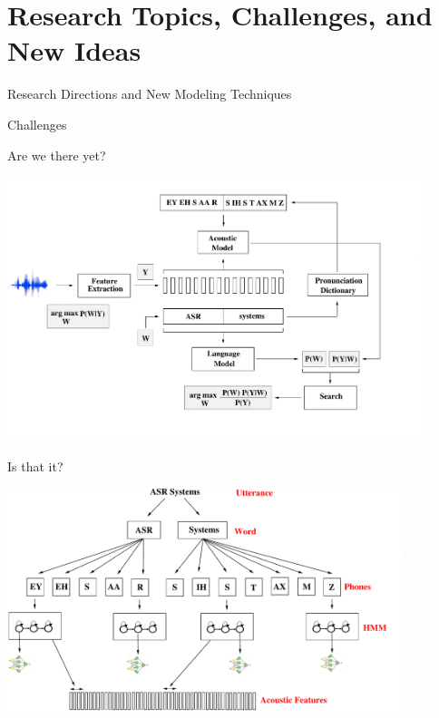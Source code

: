 \section{Research Topics, Challenges, and New Ideas}

\begin{frame}
  \begin{center}
    {\color{Maroon}\Huge Research Directions and New Modeling Techniques\par}
  \end{center}
\end{frame}


\begin{frame}
  \begin{center}
    {\color{Maroon}\Huge Challenges}
  \end{center}
\end{frame}

\begin{frame}{Are we there yet?}
  \begin{center}
    \includegraphics[height=77mm]{figures/ASR9}
  \end{center}
\end{frame}

\begin{frame}{Is that it?}
  \begin{center}
    \includegraphics[height=65mm]{figures/am-mlp}
  \end{center}
\end{frame}

